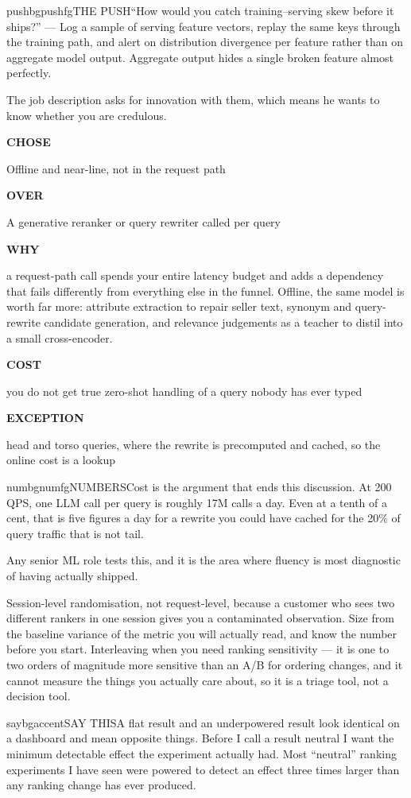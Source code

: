 \documentclass[10pt,twoside]{book}
\makeatletter
\newcommand{\csection}[1]{\par\vspace{13pt}\noindent{\sffamily\large\bfseries\color{ink}\raggedright #1\par}\vspace{4pt}}
\newenvironment{calloutsay}{\begin{co@box}{saybg}{accent}{SAY THIS}}{\end{co@box}}
\newenvironment{calloutpush}{\begin{co@box}{pushbg}{pushfg}{THE PUSH}}{\end{co@box}}
\newenvironment{calloutnum}{\begin{co@box}{numbg}{numfg}{NUMBERS}}{\end{co@box}}
\newenvironment{decide}[1]{%
  \par\smallskip\noindent
  \begin{tcolorbox}[colback=white,colframe=accent,boxrule=1pt,arc=3pt,
    left=8pt,right=8pt,top=6pt,bottom=5pt,
    title={\sffamily\bfseries\small #1},coltitle=white,colbacktitle=accent,
    fonttitle=\sffamily]%
  \small%
}{\end{tcolorbox}\par\smallskip}
\newcommand{\drow}[2]{%
  \par\noindent
  \begin{minipage}[t]{58pt}\raggedright\strut
    {\sffamily\bfseries\scriptsize\color{accent}#1}\end{minipage}%
  \hspace{6pt}%
  \begin{minipage}[t]{\dimexpr\linewidth-64pt\relax}\strut #2\end{minipage}%
  \par\vspace{3.5pt}}
\makeatother
\begin{document}
\begin{calloutpush}``How would you catch training--serving skew before it ships?'' --- Log a sample of serving feature vectors, replay the same keys through the training path, and alert on distribution divergence per feature rather than on aggregate model output. Aggregate output hides a single broken feature almost perfectly.\end{calloutpush}
\csection{LLMs}
The job description asks for innovation with them, which means he wants to know whether you are credulous.\par
\begin{decide}{Where does an LLM belong in a 200 ms search path?}
\drow{CHOSE}{Offline and near-line, not in the request path}
\drow{OVER}{A generative reranker or query rewriter called per query}
\drow{WHY}{a request-path call spends your entire latency budget and adds a dependency that fails differently from everything else in the funnel. Offline, the same model is worth far more: attribute extraction to repair seller text, synonym and query-rewrite candidate generation, and relevance judgements as a teacher to distil into a small cross-encoder.}
\drow{COST}{you do not get true zero-shot handling of a query nobody has ever typed}
\drow{EXCEPTION}{head and torso queries, where the rewrite is precomputed and cached, so the online cost is a lookup}
\end{decide}
\begin{calloutnum}Cost is the argument that ends this discussion. At 200 QPS, one LLM call per query is roughly 17M calls a day. Even at a tenth of a cent, that is five figures a day for a rewrite you could have cached for the 20\% of query traffic that is not tail.\end{calloutnum}
\csection{Experimentation}
Any senior ML role tests this, and it is the area where fluency is most diagnostic of having actually shipped.\par
Session-level randomisation, not request-level, because a customer who sees two different rankers in one session gives you a contaminated observation. Size from the baseline variance of the metric you will actually read, and know the number before you start. Interleaving when you need ranking sensitivity --- it is one to two orders of magnitude more sensitive than an A/B for ordering changes, and it cannot measure the things you actually care about, so it is a triage tool, not a decision tool.\par
\begin{calloutsay}A flat result and an underpowered result look identical on a dashboard and mean opposite things. Before I call a result neutral I want the minimum detectable effect the experiment actually had. Most ``neutral'' ranking experiments I have seen were powered to detect an effect three times larger than any ranking change has ever produced.\end{calloutsay}
\end{document}
